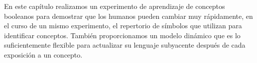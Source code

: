 


En este capítulo realizamos un experimento de aprendizaje de conceptos booleanos para demostrar que los humanos pueden cambiar muy rápidamente, en el curso de un mismo experimento, el repertorio de símbolos que utilizan para identificar conceptos. También proporcionamos un modelo dinámico que es lo suficientemente flexible para actualizar su lenguaje subyacente después de cada exposición a un concepto.


